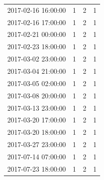 \begin{tabular}{lrrr}
2017-02-16 16:00:00 & 1 & 2 & 1 \\
2017-02-16 17:00:00 & 1 & 2 & 1 \\
2017-02-21 00:00:00 & 1 & 2 & 1 \\
2017-02-23 18:00:00 & 1 & 2 & 1 \\
2017-03-02 23:00:00 & 1 & 2 & 1 \\
2017-03-04 21:00:00 & 1 & 2 & 1 \\
2017-03-05 02:00:00 & 1 & 2 & 1 \\
2017-03-08 20:00:00 & 1 & 2 & 1 \\
2017-03-13 23:00:00 & 1 & 2 & 1 \\
2017-03-20 17:00:00 & 1 & 2 & 1 \\
2017-03-20 18:00:00 & 1 & 2 & 1 \\
2017-03-27 23:00:00 & 1 & 2 & 1 \\
2017-07-14 07:00:00 & 1 & 2 & 1 \\
2017-07-23 18:00:00 & 1 & 2 & 1 \\
\bottomrule
\end{tabular}

